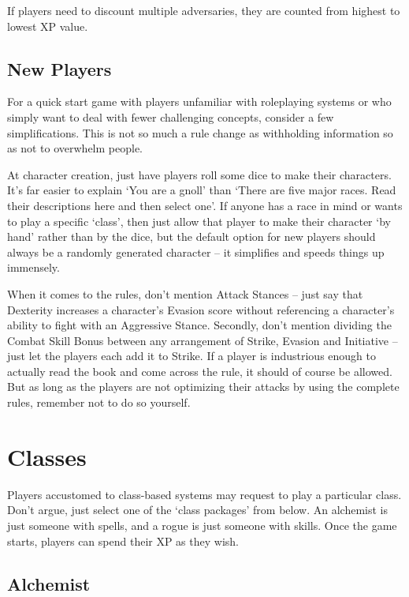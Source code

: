 If players need to discount multiple adversaries, they are counted from highest to lowest XP value.

\subsection{New Players}

For a quick start game with players unfamiliar with roleplaying systems or who simply want to deal with fewer challenging concepts, consider a few simplifications. This is not so much a rule change as withholding information so as not to overwhelm people.

At character creation, just have players roll some dice to make their characters.  It's far easier to explain `You are a gnoll' than `There are five major races.  Read their descriptions here and then select one'.  If anyone has a race in mind or wants to play a specific `class', then just allow that player to make their character `by hand' rather than by the dice, but the default option for new players should always be a randomly generated character -- it simplifies and speeds things up  immensely.

When it comes to the rules, don't mention Attack Stances -- just say that Dexterity increases a character's Evasion score without referencing a character's ability to fight with an Aggressive Stance.  Secondly, don't mention dividing the Combat Skill Bonus between any arrangement of Strike, Evasion and Initiative -- just let the players each add it to Strike. If a player is industrious enough to actually read the book and come across the rule, it should of course be allowed. But as long as the players are not optimizing their attacks by using the complete rules, remember not to do so yourself.

\section{Classes}

Players accustomed to class-based systems may request to play a particular class. Don't argue, just select one of the `class packages' from below.  An alchemist is just someone with spells, and a rogue is just someone with skills.  Once the game starts, players can spend their XP as they wish.

\subsection{Alchemist}

